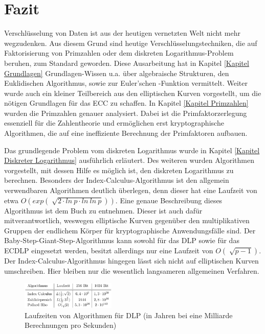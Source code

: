 \section{Fazit}
	Verschlüsselung von Daten ist aus der heutigen vernetzten Welt nicht mehr wegzudenken. Aus diesem Grund sind heutige Verschlüsselungstechniken, die auf Faktorisierung von Primzahlen oder dem diskreten Logarithmus-Problem beruhen, zum Standard geworden. Diese Ausarbeitung hat in Kapitel \ref{Kapitel Grundlagen} Grundlagen-Wissen u.a. über algebraische Strukturen, den Euklidischen Algorithmus, sowie zur Euler’schen \myPhi -Funktion vermittelt. Weiter wurde auch ein kleiner Teilbereich aus den elliptischen Kurven vorgestellt, um die nötigen Grundlagen für das ECC zu schaffen. In Kapitel \ref{Kapitel Primzahlen} wurden die Primzahlen genauer analysiert. Dabei ist die Primfaktorzerlegung essenziell für die Zahlentheorie und ermöglichen erst kryptographische Algorithmen, die auf eine ineffiziente Berechnung der Primfaktoren aufbauen.
	
	Das grundlegende Problem vom diskreten Logarithmus wurde in Kapitel \ref{Kapitel Diskreter Logarithmus} ausführlich erläutert. Des weiteren wurden Algorithmen vorgestellt, mit dessen Hilfe es möglich ist, den diskreten Logarithmus zu berechnen. Besonders der Index-Calculus-Algorithmus ist den allgemein verwendbaren Algorithmen deutlich überlegen, denn dieser hat eine Laufzeit von etwa $O(exp(\sqrt[]{2 \cdot ln~p \cdot ln~ln~p}))$. Eine genaue Beschreibung dieses Algorithmus ist dem Buch \cite{Einfuehrung:in:die:Kryptographie} zu entnehmen. Dieser ist auch dafür mitverantwortlich, weswegen elliptische Kurven gegenüber den multiplikativen Gruppen der endlichem Körper für kryptographische Anwendungsfälle  sind. Der Baby-Step-Giant-Step-Algorithmus kann sowohl für das DLP sowie für das ECDLP eingesetzt werden, besitzt allerdings nur eine Laufzeit von $O(\sqrt[]{p-1})$. Der Index-Calculus-Algorithmus hingegen lässt sich nicht auf elliptischen Kurven umschreiben. Hier bleiben nur die wesentlich langsameren allgemeinen Verfahren.\cite{Mathematisch:fuer:fortgeschrittene:Anfaenger}

	\begin{figure}
		\centering
		\includegraphics[width=0.4\textwidth]{includes/images/LaufzeitenDLP.PNG}
		\caption{Laufzeiten von Algorithmen für DLP (in Jahren bei eine Milliarde Berechnungen pro Sekunden)~\cite{DLP:ECDLP:Probleme:und:Loesungen}}
		\label{fig_LaufzeitenDLP}
	\end{figure}
	
